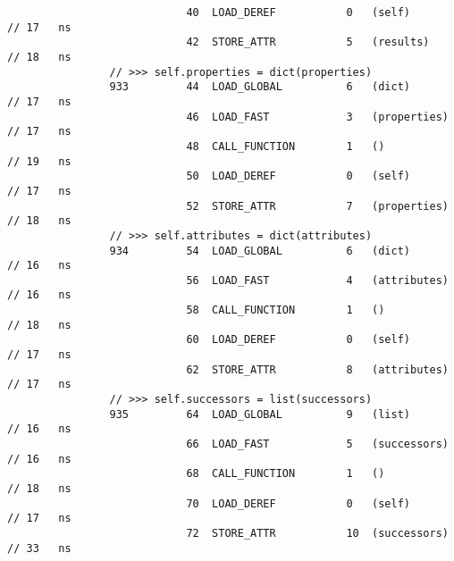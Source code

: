\begin{code}
\begin{verbatim}
                            40  LOAD_DEREF           0   (self)                             // 17   ns
                            42  STORE_ATTR           5   (results)                          // 18   ns
                // >>> self.properties = dict(properties)
                933         44  LOAD_GLOBAL          6   (dict)                             // 17   ns
                            46  LOAD_FAST            3   (properties)                       // 17   ns
                            48  CALL_FUNCTION        1   ()                                 // 19   ns
                            50  LOAD_DEREF           0   (self)                             // 17   ns
                            52  STORE_ATTR           7   (properties)                       // 18   ns
                // >>> self.attributes = dict(attributes)
                934         54  LOAD_GLOBAL          6   (dict)                             // 16   ns
                            56  LOAD_FAST            4   (attributes)                       // 16   ns
                            58  CALL_FUNCTION        1   ()                                 // 18   ns
                            60  LOAD_DEREF           0   (self)                             // 17   ns
                            62  STORE_ATTR           8   (attributes)                       // 17   ns
                // >>> self.successors = list(successors)
                935         64  LOAD_GLOBAL          9   (list)                             // 16   ns
                            66  LOAD_FAST            5   (successors)                       // 16   ns
                            68  CALL_FUNCTION        1   ()                                 // 18   ns
                            70  LOAD_DEREF           0   (self)                             // 17   ns
                            72  STORE_ATTR           10  (successors)                       // 33   ns


\end{verbatim}
\end{code}
